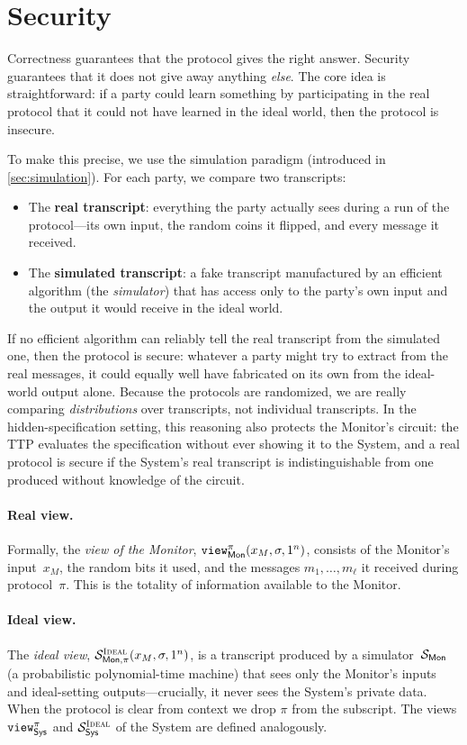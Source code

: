 \section{Security}\label{sec:security}

Correctness guarantees that the protocol gives the right answer. Security guarantees that it does not give away anything \emph{else}. The core idea is straightforward: if a party could learn something by participating in the real protocol that it could not have learned in the ideal world, then the protocol is insecure.

To make this precise, we use the simulation paradigm (introduced in \cref{sec:simulation}). For each party, we compare two transcripts:
\begin{itemize}
    \item The \textbf{real transcript}: everything the party actually sees during a run of the protocol---its own input, the random coins it flipped, and every message it received.
    \item The \textbf{simulated transcript}: a fake transcript manufactured by an efficient algorithm (the \emph{simulator}) that has access only to the party's own input and the output it would receive in the ideal world.
\end{itemize}
If no efficient algorithm can reliably tell the real transcript from the simulated one, then the protocol is secure: whatever a party might try to extract from the real messages, it could equally well have fabricated on its own from the ideal-world output alone. Because the protocols are randomized, we are really comparing \emph{distributions} over transcripts, not individual transcripts. In the hidden-specification setting, this reasoning also protects the Monitor's circuit: the TTP evaluates the specification without ever showing it to the System, and a real protocol is secure if the System's real transcript is indistinguishable from one produced without knowledge of the circuit.

\paragraph{Real view.}
Formally, the \emph{view of the Monitor}, $\texttt{view}_{\textsf{Mon}}^\pi(x_M,\sigma,1^n)$, consists of the Monitor's input~$x_M$, the random bits it used, and the messages $m_1,\dots,m_\ell$ it received during protocol~$\pi$. This is the totality of information available to the Monitor.

\paragraph{Ideal view.}
The \emph{ideal view}, $\mathcal{S}^{\textsc{Ideal}}_{\textsf{Mon},\pi}(x_M,\sigma,1^n)$, is a transcript produced by a simulator~$\mathcal{S}_{\textsf{Mon}}$ (a probabilistic polynomial-time machine) that sees only the Monitor's inputs and ideal-setting outputs---crucially, it never sees the System's private data. When the protocol is clear from context we drop $\pi$ from the subscript. The views $\texttt{view}_{\textsf{Sys}}^\pi$ and $\mathcal{S}_{\textsf{Sys}}^{\textsc{Ideal}}$ of the System are defined analogously.

